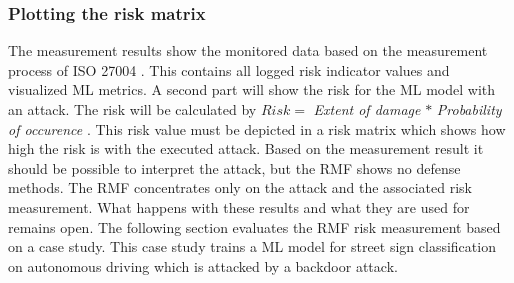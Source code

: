 \subsubsection*{Plotting the risk matrix}

The measurement results show the monitored data based on the measurement process of ISO 27004 \cite{ISO_27004_2009}. This contains all logged risk indicator values and visualized ML metrics. A second part will show the risk for the ML model with an attack. The risk will be calculated by $Risk = $ \textit{Extent of damage} $*$ \textit{Probability of occurence} \cite{DBLP:journals/access/JianxingHSH21}. This risk value must be depicted in a risk matrix which shows how high the risk is with the executed attack. Based on the measurement result it should be possible to interpret the attack, but the RMF shows no defense methods. The RMF concentrates only on the attack and the associated risk measurement. What happens with these results and what they are used for remains open. The following section evaluates the RMF risk measurement based on a case study. This case study trains a ML model for street sign classification on autonomous driving which is attacked by a backdoor attack.
